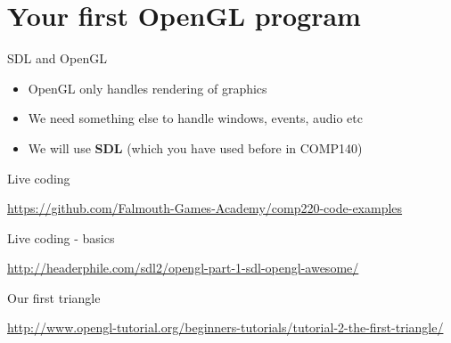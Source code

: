 \part{Your first OpenGL program}
\frame{\partpage}

\begin{frame}{SDL and OpenGL}
	\begin{itemize}
		\pause\item OpenGL only handles rendering of graphics
		\pause\item We need something else to handle windows, events, audio etc
		\pause\item We will use \textbf{SDL} (which you have used before in COMP140)
	\end{itemize}
\end{frame}

\begin{frame}{Live coding}
	\begin{center}
		\url{https://github.com/Falmouth-Games-Academy/comp220-code-examples}
	\end{center}
\end{frame}

\begin{frame}{Live coding - basics}
	\begin{center}
		\url{http://headerphile.com/sdl2/opengl-part-1-sdl-opengl-awesome/}
	\end{center}
\end{frame}

\begin{frame}{Our first triangle}
	\begin{center}
		\url{http://www.opengl-tutorial.org/beginners-tutorials/tutorial-2-the-first-triangle/}
	\end{center}
\end{frame}

